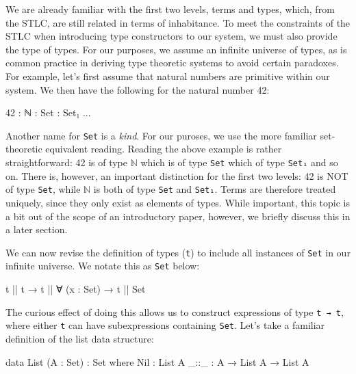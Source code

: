 \documentclass[12pt]{article}
\begin{document}
We are already familiar with the first two levels, terms and types, which, from
the STLC, are still related in terms of inhabitance. To meet the constraints of
the STLC when introducing type constructors to our system, we must also provide
the type of types. For our purposes, we assume an infinite universe of types, as
is common practice in deriving type theoretic systems to avoid certain paradoxes.
For example, let's first assume that natural numbers are primitive within our
system. We then have the following for the natural number 42:

\begin{center}
\begin{minipage}{0.4\textwidth}
\begin{code}
42 : ℕ : Set : Set₁ ...
\end{code}
\end{minipage}
\end{center}

Another name for {\tt Set} is a {\em kind}. For our puroses, we use the
more familiar set-theoretic equivalent reading. Reading the above example is rather
straightforward: 42 is of type \(\mathbb{N}\) which is of type {\tt Set}
which of type {\tt Set₁} and so on. There is, however, an important distinction
for the first two levels: 42 is NOT of type {\tt Set}, while \(\mathbb{N}\) is
both of type {\tt Set} and {\tt Set₁}. Terms are therefore treated uniquely,
since they only exist as elements of types. While important, this topic is a bit
out of the scope of an introductory paper, however, we briefly discuss this
in a later section.

We can now revise the definition of types ({\tt t}) to include all instances of
{\tt Set} in our infinite universe. We notate this as {\tt Set} below:

\begin{center}
\begin{minipage}{0.65\textwidth}
\begin{code}
t || t → t || ∀ (x : Set) → t || Set
\end{code}
\end{minipage}
\end{center}

The curious effect of doing this allows us to construct expressions of type
{\tt t → t}, where either {\tt t} can have subexpressions containing {\tt Set}.
Let's take a familiar definition of the list data structure:

\begin{center}
\begin{minipage}{0.65\textwidth}
\begin{code}
data List (A : Set) : Set where
  Nil  : List A
  _::_ : A → List A → List A
\end{code}
\end{minipage}
\end{center}
\end{document}
